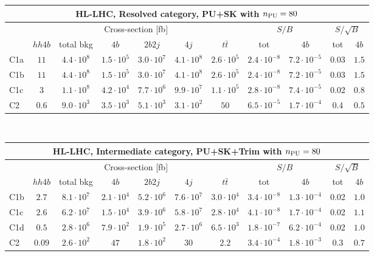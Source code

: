 \begin{tabular}{|l|cc|cccc|cc|cc|}
  \hline
\multicolumn{11}{|c|}{HL-LHC, Resolved category, PU+SK with $n_{\rm PU}=80$}\\
\hline
&  \multicolumn{6}{c|}{Cross-section [fb]} &  \multicolumn{2}{c|}{$S/B$}  &  \multicolumn{2}{c|}{$S/\sqrt{B}$}  \\
   &  $hh4b$ &  total bkg  &   $4b$    &  $2b2j$   &   $4j$    &
$t\bar{t}$ &
tot & $4b$ & tot & $4b$ \\
  \hline
  \hline
 C1a   &    $11$ &   $4.4 \cdot 10^8$   & $1.5 \cdot 10^5$ & $3.0 \cdot 10^7$ & $4.1 \cdot 10^8$ & $2.6 \cdot 10^5$     &  $ 2.4 \cdot 10^{-8}$    & $7.2 \cdot 10^{-5}$    &   0.03   & $1.5$\\
 C1b   &    $11$ &   $4.4 \cdot 10^8 $  & $1.5 \cdot 10^5$ & $3.0 \cdot 10^7$ & $4.1 \cdot 10^8$ & $2.6 \cdot 10^5$     &    $2.4 \cdot 10^{-8}$   & $7.2 \cdot 10^{-5}$    &   0.03   & $1.5$ \\
 C1c   &     $3$ &   $1.1 \cdot 10^8$   & $4.2 \cdot 10^4$ & $7.7 \cdot 10^6$ & $9.9 \cdot 10^7$ & $1.1 \cdot 10^5$     &   $2.8 \cdot 10^{-8}$    & $7.4 \cdot 10^{-5}$    &   0.02    & $0.8$ \\
 C2    &  $0.6$  &   $9.0 \cdot 10^3$   & $3.5 \cdot 10^3$ & $5.1 \cdot 10^3$ & $3.1 \cdot 10^2$ & $50$     &    $6.5 \cdot 10^{-5}$   & $1.7 \cdot 10^{-4}$    &   0.4                & $0.5$ \\
\hline
\end{tabular}
  $\,$ \\
  \vspace{0.5cm}
 \begin{tabular}{|l|cc|cccc|cc|cc|}
  \hline
  \multicolumn{11}{|c|}{HL-LHC, Intermediate category, PU+SK+Trim with $n_{\rm PU}=80$}\\
  \hline
&  \multicolumn{6}{c|}{Cross-section [fb]} &  \multicolumn{2}{c|}{$S/B$}  &  \multicolumn{2}{c|}{$S/\sqrt{B}$}  \\
   &  $hh4b$ &  total bkg  &   $4b$    &  $2b2j$   &   $4j$    &
$t\bar{t}$ &
tot & $4b$ & tot & $4b$ \\
  \hline
  \hline
 C1b     &  $2.7$  &   $8.1 \cdot 10^7$   & $2.1 \cdot 10^4$ & $5.2 \cdot 10^6$ & $7.6 \cdot 10^7$ & $3.0 \cdot 10^4$          &     $3.4 \cdot 10^{-8}$     & $1.3 \cdot 10^{-4}$        &   0.02    & $1.0 $ \\
 C1c     & $2.6 $  &   $6.2 \cdot 10^7 $  & $1.5 \cdot 10^4$ & $3.9 \cdot 10^6$ & $5.8 \cdot 10^7$ & $2.8 \cdot 10^4$          &     $4.1 \cdot 10^{-8}$     & $1.7 \cdot 10^{-4}$        &   0.02    & $1.1 $ \\
 C1d     & $0.5$   &   $2.8 \cdot 10^6$   & $7.9 \cdot 10^2$ & $1.9 \cdot 10^5$ & $2.7 \cdot 10^6$ & $6.5 \cdot 10^3$          &     $1.8 \cdot 10^{-7}$     & $6.2 \cdot 10^{-4}$        &   0.02    & $1.0 $ \\
 C2      & $0.09$  &   $2.6 \cdot 10^2$   & $47$             & $1.8 \cdot 10^2$ & $30$             & $2.2 $                   &      $3.4 \cdot 10^{-4}$     & $1.8 \cdot 10^{-3}$        &   0.3                & $0.7 $ \\
\hline
\end{tabular}

